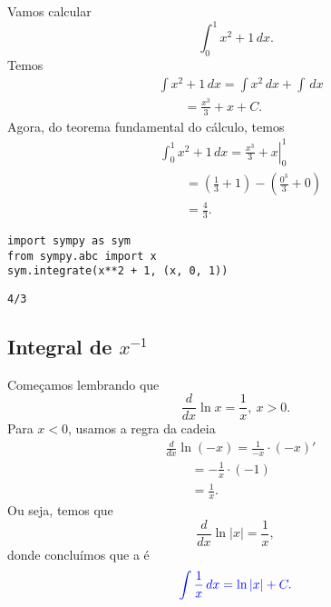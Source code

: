 \begin{ex}
  Vamos calcular
  \begin{equation}
    \int_{0}^1 x^2 + 1\,dx.
  \end{equation}
  Temos
  \begin{align}
    & \int x^2 + 1\,dx = \int x^2\,dx + \int \,dx\\
    &\text{}\qquad = \frac{x^3}{3} + x + C.
  \end{align}
  Agora, do teorema fundamental do cálculo, temos
  \begin{align}
    & \int_0^1 x^2+1\,dx = \left. \frac{x^3}{3} + x\right|_0^1 \\
    &\text{}\qquad = \left(\frac{1}{3} + 1 \right)- \left(\frac{0^3}{3} + 0\right) \\
    &\text{}\qquad = \frac{4}{3}.
  \end{align}

\begin{lstlisting}
import sympy as sym
from sympy.abc import x
sym.integrate(x**2 + 1, (x, 0, 1))
\end{lstlisting}

\begin{verbatim}
4/3
\end{verbatim}

\end{ex}

\subsection{Integral de $x^{-1}$}

Começamos lembrando que
\begin{equation}
  \frac{d}{dx}\ln x = \frac{1}{x}, ~x>0.
\end{equation}
Para $x < 0$, usamos a regra da cadeia
\begin{align}
  & \frac{d}{dx}\ln(-x) = \frac{1}{-x}\cdot (-x)'\\
  &\text{}\qquad = -\frac{1}{x}\cdot (-1)\\
  &\text{}\qquad = \frac{1}{x}.
\end{align}
Ou seja, temos que 
\begin{equation}
  \frac{d}{dx}\ln|x| = \frac{1}{x},
\end{equation}
donde concluímos que a  é
\begin{equation}\color{blue}\int\frac{1}{x}\,dx = \ln|x| + C.
\end{equation}

